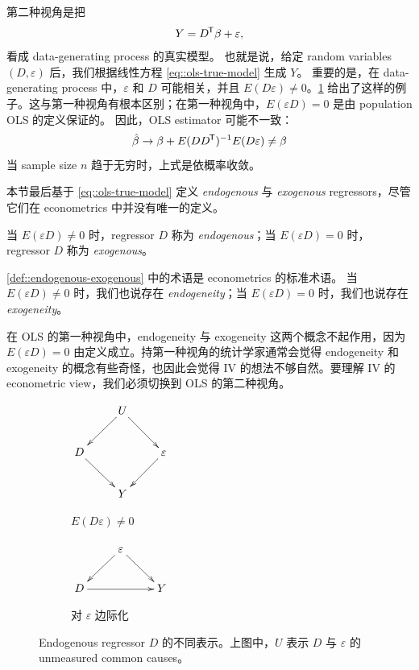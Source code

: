 第二种视角是把
\begin{eqnarray}\label{eq::ols-true-model}
Y = D  ^{\mkern-1.5mu\mathsf{T}} \beta  + \varepsilon,
\end{eqnarray}
看成 data-generating process 的真实模型。
也就是说，给定 random variables $(D, \varepsilon)$ 后，我们根据线性方程 \cref{eq::ols-true-model} 生成 $Y$。
重要的是，在 data-generating process 中，$\varepsilon$ 和 $D$ 可能相关，并且 $E( D \varepsilon) \neq  0$。\cref{fig::endogenous-regressor} 给出了这样的例子。这与第一种视角有根本区别；在第一种视角中，$E(\varepsilon D) = 0$ 是由 population OLS 的定义保证的。
因此，OLS estimator 可能不一致：
$$
\hat{\beta} \rightarrow \beta + E(DD^{\mkern-1.5mu\mathsf{T}})^{-1} E(D\varepsilon) \neq \beta 
$$
当 sample size $n$ 趋于无穷时，上式是依概率收敛。 


本节最后基于 \cref{eq::ols-true-model} 定义 {\it endogenous} 与 {\it exogenous} regressors，尽管它们在 econometrics 中并没有唯一的定义。 



\begin{definition}
\label{def::endogenous-exogenous}
当 $E(\varepsilon D) \neq  0$ 时，regressor $D$ 称为 {\it endogenous}；当 $E(\varepsilon D) =  0$ 时，regressor $D$ 称为 {\it exogenous}。 
\end{definition}

\cref{def::endogenous-exogenous} 中的术语是 econometrics 的标准术语。
当 $E(\varepsilon D) \neq  0$ 时，我们也说存在 {\it endogeneity}；当 $E(\varepsilon D) =  0$ 时，我们也说存在 {\it exogeneity}。

在 OLS 的第一种视角中，endogeneity 与 exogeneity 这两个概念不起作用，因为 $E(\varepsilon D) =  0$ 由定义成立。持第一种视角的统计学家通常会觉得 endogeneity 和 exogeneity 的概念有些奇怪，也因此会觉得 IV 的想法不够自然。要理解 IV 的 econometric view，我们必须切换到 OLS 的第二种视角。 




 

\begin{figure}[h]
\centering
\begin{subfigure}[]{0.4\textwidth}
                \centering
$
\xymatrix{
& U \ar[dl] \ar[dr]& \\
D \ar[dr] & & \varepsilon \ar[dl] \\
&Y&
}
$                \caption{$E(D\varepsilon) \neq 0$}
        \end{subfigure}%
        
        \begin{subfigure}[]{0.4\textwidth}
                \centering
$
\xymatrix{
&\varepsilon  \ar[dl] \ar[dr] &\\
D \ar[rr]&&Y
}
$
                \caption{对 $\varepsilon$ 边际化}
        \end{subfigure}%
        
\caption{Endogenous regressor $D$ 的不同表示。上图中，$U$ 表示 $D$ 与 $\varepsilon$ 的 unmeasured common causes。}\label{fig::endogenous-regressor}
\end{figure}



